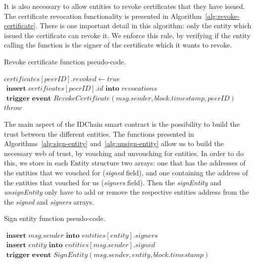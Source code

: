 It is also necessary to allow entities to revoke certificates that they have issued.
The certificate revocation functionality is presented in Algorithm~\ref{alg:revoke-certificate}.
There is one important detail in this algorithm: only the entity which issued the certificate can revoke it.
We enforce this rule, by verifying if the entity calling the function is the signer of the certificate which it wants to revoke.

\begin{algorithm}
  \caption{Revoke certificate function pseudo-code.}
  \label{alg:revoke-certificate}
  \begin{algorithmic}[1]
        \State $certificates[peerID].revoked \gets true$
        \State $\textbf{ insert } certificates[peerID].id \textbf{ into } revocations$
        \State $\textbf{ trigger event } RevokeCertificate(msg.sender, block.timestamp, peerID)$
      \Else
        \State $throw$
      \EndIf
    \EndFunction
  \end{algorithmic}
\end{algorithm}



The main aspect of the IDChain smart contract is the possibility to build the trust between the different entities.
The functions presented in Algorithms~\ref{alg:sign-entity} and~\ref{alg:unsign-entity} allow us to build the necessary web of trust, by vouching and unvouching for entities.
In order to do this, we store in each Entity structure two arrays: one that has the addresses of the entities that we vouched for (\textit{signed} field), and one containing the address of the entities that vouched for us (\textit{signers} field).
Then the \textit{signEntity} and \textit{unsignEntity} only have to add or remove the respective entities address from the the \textit{signed} and \textit{signers} arrays.

\begin{algorithm}
  \caption{Sign entity function pseudo-code.}
  \label{alg:sign-entity}
  \begin{algorithmic}[1]
      \State $\textbf{ insert } msg.sender \textbf{ into } entities[entity].signers$
      \State $\textbf{ insert } entity \textbf{ into } entities[msg.sender].signed$
      \State $\textbf{ trigger event } SignEntity(msg.sender, entity, block.timestamp)$
      \State {}
    \EndFunction
  \end{algorithmic}
\end{algorithm}

